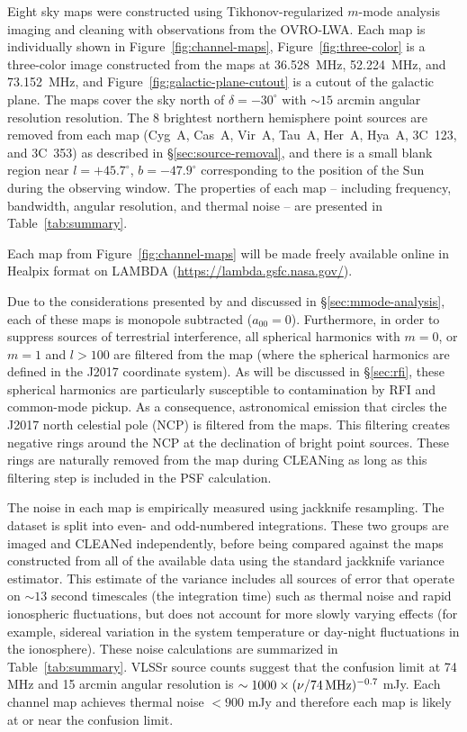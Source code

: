 \documentclass[twocolumn]{aastex61}
\begin{document}
Eight sky maps were constructed using Tikhonov-regularized $m$-mode analysis imaging and cleaning
with observations from the OVRO-LWA. Each map is individually shown in
Figure~\ref{fig:channel-maps}, Figure~\ref{fig:three-color} is a three-color image constructed from
the maps at 36.528~MHz, 52.224~MHz, and 73.152~MHz, and Figure~\ref{fig:galactic-plane-cutout} is a
cutout of the galactic plane. The maps cover the sky north of $\delta=-30^\circ$ with $\sim 15$
arcmin angular resolution resolution. The 8 brightest northern hemisphere point sources are removed
from each map (Cyg~A, Cas~A, Vir~A, Tau~A, Her~A, Hya~A, 3C~123, and 3C~353) as described in
\S\ref{sec:source-removal}, and there is a small blank region near $l=+45.7^\circ$, $b=-47.9^\circ$
corresponding to the position of the Sun during the observing window. The properties of each map --
including frequency, bandwidth, angular resolution, and thermal noise -- are presented in
Table~\ref{tab:summary}.

Each map from Figure~\ref{fig:channel-maps} will be made freely available online in Healpix format
\citep{2005ApJ...622..759G} on LAMBDA (\url{https://lambda.gsfc.nasa.gov/}).

Due to the considerations presented by \citet{2016ApJ...826..116V} and discussed in
\S\ref{sec:mmode-analysis}, each of these maps is monopole subtracted ($a_{00}=0$).  Furthermore, in
order to suppress sources of terrestrial interference, all spherical harmonics with $m=0$, or $m=1$
and $l>100$ are filtered from the map (where the spherical harmonics are defined in the J2017
coordinate system). As will be discussed in \S\ref{sec:rfi}, these spherical harmonics are
particularly susceptible to contamination by RFI and common-mode pickup. As a consequence,
astronomical emission that circles the J2017 north celestial pole (NCP) is filtered from the maps.
This filtering creates negative rings around the NCP at the declination of bright point sources.
These rings are naturally removed from the map during CLEANing as long as this filtering step is
included in the PSF calculation.

The noise in each map is empirically measured using jackknife resampling. The dataset is split into
even- and odd-numbered integrations. These two groups are imaged and CLEANed independently, before
being compared against the maps constructed from all of the available data using the standard
jackknife variance estimator. This estimate of the variance includes all sources of error that
operate on $\sim13$ second timescales (the integration time) such as thermal noise and rapid
ionospheric fluctuations, but does not account for more slowly varying effects (for example,
sidereal variation in the system temperature or day-night fluctuations in the ionosphere). These
noise calculations are summarized in Table~\ref{tab:summary}.  VLSSr source counts
\citep{2014MNRAS.440..327L} suggest that the confusion limit at 74 MHz and 15 arcmin angular
resolution is $\sim 1000\times(\nu/74\,{\rm MHz})^{-0.7}$ mJy.  Each channel map achieves thermal
noise $<900$ mJy and therefore each map is likely at or near the confusion limit.
\end{document}

